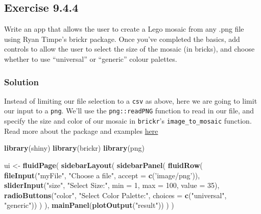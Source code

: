 \documentclass[]{book}
\newenvironment{Shaded}{\begin{snugshade}}{\end{snugshade}}
\newcommand{\DataTypeTok}[1]{\textcolor[rgb]{0.13,0.29,0.53}{#1}}
\newcommand{\DecValTok}[1]{\textcolor[rgb]{0.00,0.00,0.81}{#1}}
\newcommand{\KeywordTok}[1]{\textcolor[rgb]{0.13,0.29,0.53}{\textbf{#1}}}
\newcommand{\NormalTok}[1]{#1}
\newcommand{\StringTok}[1]{\textcolor[rgb]{0.31,0.60,0.02}{#1}}
\begin{document}
\hypertarget{exercise-9.4.4}{%
\subsection*{Exercise 9.4.4}\label{exercise-9.4.4}}

Write an app that allows the user to create a Lego mosaic from any .png file using Ryan Timpe's brickr package. Once you've completed the basics, add controls to allow the user to select the size of the mosaic (in bricks), and choose whether to use ``universal'' or ``generic'' colour palettes.

\begin{solution}

\hypertarget{solution-3}{%
\subsubsection*{Solution}\label{solution-3}}

Instead of limiting our file selection to a \texttt{csv} as above, here we are going to limit our input to a \texttt{png}. We'll use the \texttt{png::readPNG} function to read in our file, and specify the size and color of our mosaic in \texttt{brickr}'s \texttt{image\_to\_mosaic} function. Read more about the package and examples \href{https://github.com/ryantimpe/brickr}{here}

\begin{Shaded}
\begin{Highlighting}[]
\KeywordTok{library}\NormalTok{(shiny)}
\KeywordTok{library}\NormalTok{(brickr)}
\KeywordTok{library}\NormalTok{(png)}

\NormalTok{ui <-}\StringTok{ }\KeywordTok{fluidPage}\NormalTok{(}
    \KeywordTok{sidebarLayout}\NormalTok{(}
        \KeywordTok{sidebarPanel}\NormalTok{(}
            \KeywordTok{fluidRow}\NormalTok{(}
                \KeywordTok{fileInput}\NormalTok{(}\StringTok{"myFile"}\NormalTok{, }\StringTok{"Choose a file"}\NormalTok{, }\DataTypeTok{accept =} \KeywordTok{c}\NormalTok{(}\StringTok{'image/png'}\NormalTok{)),}
                \KeywordTok{sliderInput}\NormalTok{(}\StringTok{"size"}\NormalTok{, }\StringTok{"Select Size:"}\NormalTok{, }\DataTypeTok{min =} \DecValTok{1}\NormalTok{, }\DataTypeTok{max =} \DecValTok{100}\NormalTok{, }\DataTypeTok{value =} \DecValTok{35}\NormalTok{),}
                \KeywordTok{radioButtons}\NormalTok{(}\StringTok{"color"}\NormalTok{, }\StringTok{"Select Color Palette:"}\NormalTok{, }\DataTypeTok{choices =} \KeywordTok{c}\NormalTok{(}\StringTok{"universal"}\NormalTok{, }\StringTok{"generic"}\NormalTok{))}
\NormalTok{            )}
\NormalTok{        ),}
        \KeywordTok{mainPanel}\NormalTok{(}\KeywordTok{plotOutput}\NormalTok{(}\StringTok{"result"}\NormalTok{))}
\NormalTok{    )}
\NormalTok{)}



\end{Highlighting}
\end{Shaded}
\end{solution}
\end{document}
